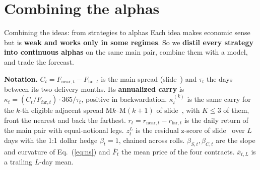 \documentclass[10pt, aspectratio=169]{beamer}
\newcommand{\key}[1]{\textcolor{accent}{\textbf{#1}}}
\begin{document}
\section{Combining the alphas}

\begin{frame}{Combining the ideas: from strategies to alphas}
\footnotesize
Each idea makes economic sense but is \key{weak and works only in some
regimes}. So we \key{distil every strategy into continuous alphas} on the same
main pair, combine them with a model, and trade the forecast.

\vspace{0.2ex}
{\scriptsize
\textbf{Notation.} $C_t=F_{\text{near},t}-F_{\text{far},t}$ is the main spread
(slide~\pageref{sl:a}) and $\tau_t$ the days between its two delivery months. Its \key{annualized carry} is
$\kappa_t=(C_t/F_{\text{far},t})\cdot365/\tau_t$, positive in backwardation.
$\kappa^{(k)}_t$ is the same carry for the $k$-th eligible adjacent spread
M$k$--M$(k{+}1)$ of slide~\pageref{sl:b}, with $K\le3$ of them, front the
nearest and back the farthest. $r_t=r_{\text{near},t}-r_{\text{far},t}$ is the
daily return of the main pair with equal-notional legs. $z^{L}_t$ is the
residual z-score of slide~\pageref{sl:c} over $L$ days with the 1:1 dollar
hedge $\beta_t=1$, chained across rolls. $\beta_{S,t},\beta_{C,t}$ are the slope and
curvature of Eq.~(\ref{eq:ns}) and $\overline{F}_t$ the mean price of the four
contracts. $\overline{x}_{t,L}$ is a trailing $L$-day mean.}


\end{frame}
\end{document}
